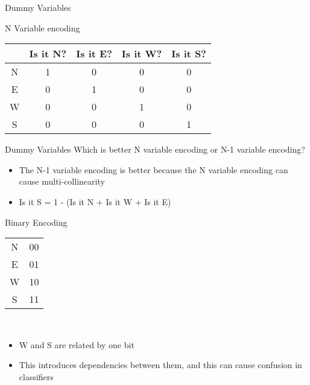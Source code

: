 \documentclass{beamer}
\begin{document}
    
    \begin{frame}{Dummy Variables}
    \begin{center}
    
    N Variable encoding\\
    \vspace{1em}
    \begin{tabular}{|c|c|c|c|c|}
    \hline
    & Is it N? &Is it E? &Is it W? & Is it S?\\
    \hline
    \hline
    N & 1&0&0&0 \\
    E & 0&1&0&0\\
    W & 0&0&1&0\\
    S & 0&0&0&1\\
    \hline
    \end{tabular}
    \end{center}
    \end{frame}
    
    
    
    \begin{frame}{Dummy Variables}
    Which is better N variable encoding or N-1 variable encoding? \\
    
    \begin{itemize}[<+->]
        \item The N-1 variable encoding is better because the N variable encoding can cause multi-collinearity
        \item Is it S = 1 - (Is it N + Is it W + Is it E)
    \end{itemize} 
    
    \end{frame}
    
    
    \begin{frame}{Binary Encoding}
    
    \begin{center}
    \begin{tabular}{|c|c|}
    \hline
    N & 00 \\
    E& 01\\
    W & 10\\
    S& 11\\
    \hline
    \end{tabular}\\
    \end{center}
    
    
    \vspace{1em}
    \begin{itemize}[<+->]
        \item W and S are related by one bit
        \item This introduces dependencies between them, and this can cause confusion in classifiers
    \end{itemize}
    \end{frame}
    
\end{document}
